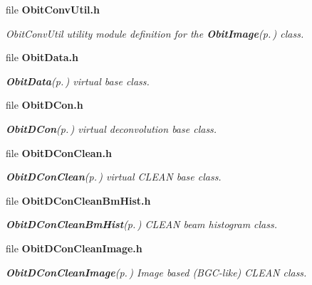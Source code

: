 \begin{CompactItemize}
\item 
file {\bf Obit\-Conv\-Util.h}
\begin{CompactList}\small\item\em Obit\-Conv\-Util utility module definition for the {\bf Obit\-Image}{\rm (p.\,\pageref{structObitImage})} class. \item\end{CompactList}

\item 
file {\bf Obit\-Data.h}
\begin{CompactList}\small\item\em {\bf Obit\-Data}{\rm (p.\,\pageref{structObitData})} virtual base class. \item\end{CompactList}

\item 
file {\bf Obit\-DCon.h}
\begin{CompactList}\small\item\em {\bf Obit\-DCon}{\rm (p.\,\pageref{structObitDCon})} virtual deconvolution base class. \item\end{CompactList}

\item 
file {\bf Obit\-DCon\-Clean.h}
\begin{CompactList}\small\item\em {\bf Obit\-DCon\-Clean}{\rm (p.\,\pageref{structObitDConClean})} virtual CLEAN base class. \item\end{CompactList}

\item 
file {\bf Obit\-DCon\-Clean\-Bm\-Hist.h}
\begin{CompactList}\small\item\em {\bf Obit\-DCon\-Clean\-Bm\-Hist}{\rm (p.\,\pageref{structObitDConCleanBmHist})} CLEAN beam histogram class. \item\end{CompactList}

\item 
file {\bf Obit\-DCon\-Clean\-Image.h}
\begin{CompactList}\small\item\em {\bf Obit\-DCon\-Clean\-Image}{\rm (p.\,\pageref{structObitDConCleanImage})} Image based (BGC-like) CLEAN class. \item\end{CompactList}


\end{CompactItemize}
